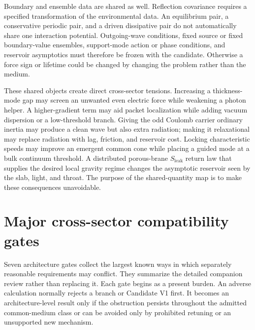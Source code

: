 Boundary and ensemble data are shared as well. Reflection covariance requires a
specified transformation of the environmental data. An equilibrium pair, a
conservative periodic pair, and a driven dissipative pair do not automatically
share one interaction potential. Outgoing-wave conditions, fixed source or
fixed boundary-value ensembles, support-mode action or phase conditions, and
reservoir asymptotics must therefore be frozen with the candidate. Otherwise a
force sign or lifetime could be changed by changing the problem rather than the
medium.

These shared objects create direct cross-sector tensions. Increasing a
thickness-mode gap may screen an unwanted even electric force while weakening a
photon helper. A higher-gradient term may aid packet localization while adding
vacuum dispersion or a low-threshold branch. Giving the odd Coulomb carrier
ordinary inertia may produce a clean wave but also extra radiation; making it
relaxational may replace radiation with lag, friction, and reservoir cost.
Locking characteristic speeds may improve an emergent common cone while placing
a guided mode at a bulk continuum threshold. A distributed porous-brane
\(S_{\mathrm{leak}}\) return law that supplies the desired local gravity regime
changes the asymptotic reservoir seen by the slab, light, and throat. The purpose
of the shared-quantity map is to make these consequences unavoidable.

\section{Major cross-sector compatibility gates}

Seven architecture gates collect the largest known ways in which separately
reasonable requirements may conflict. They summarize the detailed companion
review rather than replacing it. Each gate begins as a present burden. An
adverse calculation normally rejects a branch or Candidate V1 first. It becomes
an architecture-level result only if the obstruction persists throughout the
admitted common-medium class or can be avoided only by prohibited retuning or
an unsupported new mechanism.

